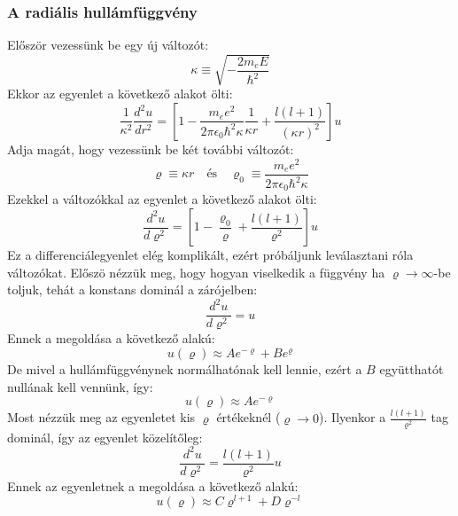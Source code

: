 \documentclass[../main.tex]{subfiles}
\begin{document}
\subsubsection*{A radiális hullámfüggvény}
Először vezessünk be egy új változót:
\begin{equation}
    \kappa \equiv \sqrt{- \frac{2m_e E}{\hbar^2}}
\end{equation}
Ekkor az egyenlet a következő alakot ölti:
\begin{equation}
   \frac{1}{\kappa^2} \frac{d^2 u}{dr^2} = \left[1 - \frac{m_e e^2}{2\pi \epsilon_0 \hbar^2 \kappa} \frac{1}{\kappa r} + \frac{l(l + 1)}{(\kappa r)^2}\right]u
\end{equation}
Adja magát, hogy vezessünk be két további változót:
\begin{equation}
    \varrho \equiv \kappa r \quad \text{és} \quad \varrho_0 \equiv \frac{m_e e^2}{2\pi \epsilon_0 \hbar^2 \kappa}
\end{equation}
Ezekkel a változókkal az egyenlet a következő alakot ölti:
\begin{equation}
   \frac{d^2 u}{d \varrho^2} = \left[1 - \frac{\varrho_0}{\varrho} + \frac{l(l + 1)}{\varrho^2}\right]u
\end{equation}
Ez a differenciálegyenlet elég komplikált, ezért próbáljunk leválasztani róla változókat. Előszö nézzük meg, hogy hogyan viselkedik
a függvény ha $\varrho \to \infty$-be toljuk, tehát a konstans dominál a zárójelben:
\begin{equation}
   \frac{d^2 u}{d \varrho^2} = u
\end{equation}
Ennek a megoldása a következő alakú:
\begin{equation}
    u(\varrho) \approx A e^{-\varrho} + B e^{\varrho}
\end{equation}
De mivel a hullámfüggvénynek normálhatónak kell lennie, ezért a $B$ együtthatót nullának kell vennünk, így:
\begin{equation}
    u(\varrho) \approx A e^{-\varrho}
\end{equation}
Most nézzük meg az egyenletet kis $\varrho$ értékeknél ($\varrho \to 0$). Ilyenkor a $\frac{l(l + 1)}{\varrho^2}$ tag dominál, így az egyenlet közelítőleg:
\begin{equation}
   \frac{d^2 u}{d \varrho^2} = \frac{l(l + 1)}{\varrho^2} u
\end{equation}
Ennek az egyenletnek a megoldása a következő alakú:
\begin{equation}
    u(\varrho) \approx C \varrho^{l + 1} + D \varrho^{-l}
\end{equation}
\end{document}
